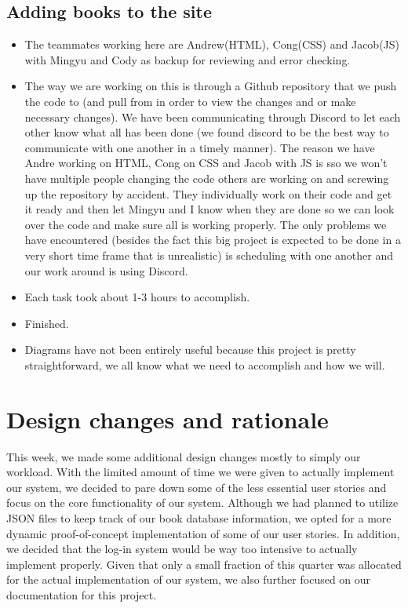 \documentclass[12pt]{article}
\begin{document}
		\subsection{Adding books to the site}
		\begin{itemize}

		\item The teammates working here are Andrew(HTML), Cong(CSS) and Jacob(JS) with Mingyu and Cody as backup for reviewing and error checking.

		\item The way we are working on this is through a Github repository that we push the code to (and pull from in order to view the changes and or make necessary changes).  We have been communicating through Discord to let each other know what all has been done (we found discord to be the best way to communicate with one another in a timely manner).  The reason we have Andre working on HTML, Cong on CSS and Jacob with JS is sso we won’t have multiple people changing the code others are working on and screwing up the repository by accident.  They individually work on their code and get it ready and then let Mingyu and I know when they are done so we can look over the code and make sure all is working properly.  The only problems we have encountered (besides the fact this big project is expected to be done in a very short time frame that is unrealistic) is scheduling with one another and our work around is using Discord.

		\item Each task took about 1-3 hours to accomplish.

		\item Finished.

		\item Diagrams have not been entirely useful because this project is pretty straightforward, we all know what we need to accomplish and how we will.

		\end{itemize}



	\section{Design changes and rationale}
	This week, we made some additional design changes mostly to simply our workload. With the limited amount of time we were given to actually implement our system, we decided to pare down some of the less essential user stories and focus on the core functionality of our system. Although we had planned to utilize JSON files to keep track of our book database information, we opted for a more dynamic proof-of-concept implementation of some of our user stories. In addition, we decided that the log-in system would be way too intensive to actually implement properly. Given that only a small fraction of this quarter was allocated for the actual implementation of our system, we also further focused on our documentation for this project.
\end{document}
